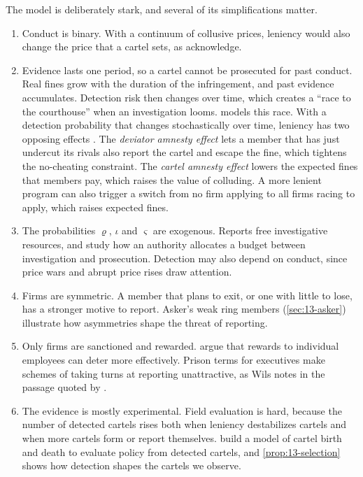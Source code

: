 The model is deliberately stark, and several of its simplifications matter.
\begin{enumerate}[label=(\arabic*)]
\item Conduct is binary. With a continuum of collusive prices, leniency would also change the price that a cartel
sets, as \citet[footnote~7]{ChenRey2013} acknowledge.
\item Evidence lasts one period, so a cartel cannot be prosecuted for past conduct. Real fines grow with the duration
of the infringement, and past evidence accumulates. Detection risk then changes over time, which creates a ``race to
the courthouse'' when an investigation looms. \citet{Harrington2008} models this race. With a detection probability
that changes stochastically over time, leniency has two opposing effects \citep[p.~209]{AskerNocke2021}. The
\emph{deviator amnesty effect} lets a member that has just undercut its rivals also report the cartel and escape the
fine, which tightens the no-cheating constraint. The \emph{cartel amnesty effect} lowers the expected fines that
members pay, which raises the value of colluding. A more lenient program can also trigger a switch from no firm
applying to all firms racing to apply, which raises expected fines.
\item The probabilities $\varrho$, $\iota$ and $\varsigma$ are exogenous. Reports free investigative resources, and
\citet{MottaPolo2003} study how an authority allocates a budget between investigation and prosecution. Detection may
also depend on conduct, since price wars and abrupt price rises draw attention.
\item Firms are symmetric. A member that plans to exit, or one with little to lose, has a stronger motive to report.
Asker's weak ring members (\cref{sec:13-asker}) illustrate how asymmetries shape the threat of reporting.
\item Only firms are sanctioned and rewarded. \citet{AubertReyKovacic2006} argue that rewards to individual employees
can deter more effectively. Prison terms for executives make schemes of taking turns at reporting unattractive, as
Wils notes in the passage quoted by \citet[p.~2]{ChenRey2013}.
\item The evidence is mostly experimental. Field evaluation is hard, because the number of detected cartels rises both
when leniency destabilizes cartels and when more cartels form or report themselves. \citet{HarringtonChang2009} build
a model of cartel birth and death to evaluate policy from detected cartels, and \cref{prop:13-selection} shows how
detection shapes the cartels we observe.
\end{enumerate}

